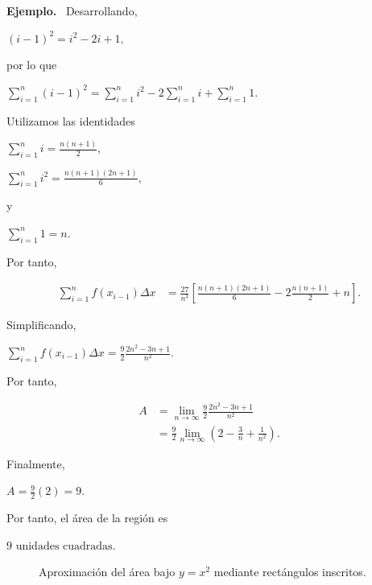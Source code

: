 \documentclass[12pt]{article}
\newenvironment{Ejem}
{\par\medskip\noindent\textbf{Ejemplo.}\ }
{\par\medskip}
\begin{document}
\begin{Ejem}
Desarrollando,

$
(i-1)^2=i^2-2i+1,
$

por lo que

$
\sum_{i=1}^{n}(i-1)^2
=
\sum_{i=1}^{n}i^2
-
2\sum_{i=1}^{n}i
+
\sum_{i=1}^{n}1.
$

Utilizamos las identidades

$
\sum_{i=1}^{n}i
=
\frac{n(n+1)}{2},
$

$
\sum_{i=1}^{n}i^2
=
\frac{n(n+1)(2n+1)}{6},
$

y

$
\sum_{i=1}^{n}1=n.
$

Por tanto,

\begin{align*}
\sum_{i=1}^{n}
f(x_{i-1})\Delta x
&=
\frac{27}{n^3}
\left[
\frac{n(n+1)(2n+1)}{6}
-
2\frac{n(n+1)}{2}
+n
\right].
\end{align*}

Simplificando,

$
\sum_{i=1}^{n}
f(x_{i-1})\Delta x
=
\frac{9}{2}
\frac{2n^2-3n+1}{n^2}.
$

Por tanto,

\begin{align*}
A
&=
\lim_{n\to\infty}
\frac{9}{2}
\frac{2n^2-3n+1}{n^2}\\
&=
\frac{9}{2}
\lim_{n\to\infty}
\left(
2-\frac{3}{n}+\frac{1}{n^2}
\right).
\end{align*}

Finalmente,

$
A
=
\frac{9}{2}(2)
=
\boxed{9}.
$

Por tanto, el área de la región es

$
\boxed{9\text{ unidades cuadradas}}.
$

\begin{figure}[htbp]
\centering


\caption{Aproximación del área bajo $y=x^2$ mediante
rectángulos inscritos.}
\end{figure}
\end{Ejem}
\end{document}

